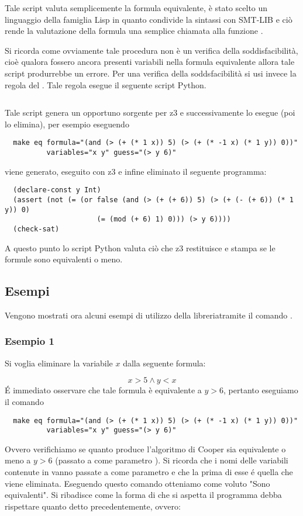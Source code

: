 \documentclass[11pt,letterpaper,twoside]{article}
\begin{document}
Tale script valuta semplicemente la formula equivalente, è stato scelto un
linguaggio della famiglia Lisp in quanto condivide la sintassi con
SMT-LIB e ciò rende la valutazione della formula una semplice chiamata alla
funzione .

Si ricorda come ovviamente tale procedura non è un verifica della
soddisfacibilità, cioè qualora fossero ancora presenti variabili nella formula
equivalente allora tale script produrrebbe un errore. Per una verifica della
soddsfacibilità si usi invece la regola  del .
Tale regola esegue il seguente script Python\autocite{python}.

\inputminted[linenos]{python}{../eq.py}

Tale script genera un opportuno sorgente per
z3\autocite{yices} e successivamente lo esegue (poi lo elimina), per esempio eseguendo

\begin{verbatim}
  make eq formula="(and (> (+ (* 1 x)) 5) (> (+ (* -1 x) (* 1 y)) 0))"
          variables="x y" guess="(> y 6)"
\end{verbatim}

viene generato, eseguito con z3 e infine eliminato il seguente programma:

\begin{verbatim}
  (declare-const y Int)
  (assert (not (= (or false (and (> (+ (+ 6)) 5) (> (+ (- (+ 6)) (* 1 y)) 0)
                      (= (mod (+ 6) 1) 0))) (> y 6))))
  (check-sat)
\end{verbatim}

A questo punto lo script Python valuta ciò che z3 restituisce e stampa se le formule
sono equivalenti o meno.

\subsection{Esempi}
Vengono mostrati ora alcuni esempi di utilizzo della libreriatramite il comando
.
\subsubsection{Esempio 1}
Si voglia eliminare la variabile $x$ dalla seguente formula:

$$ x > 5 \land y < x $$
\'E immediato osservare che tale formula è equivalente a $y > 6$, pertanto
eseguiamo il comando
\begin{verbatim}
  make eq formula="(and (> (+ (* 1 x)) 5) (> (+ (* -1 x) (* 1 y)) 0))"
          variables="x y" guess="(> y 6)"
\end{verbatim}
Ovvero verifichiamo se quanto produce l'algoritmo di Cooper sia equivalente o
meno a $y > 6$ (passato a  come parametro ).
Si ricorda che i nomi delle variabili contenute in  vanno
passate a  come parametro  e che la prima
di esse \'e quella che viene eliminata.
Eseguendo questo comando otteniamo come voluto "Sono equivalenti".
Si ribadisce come la forma di  che si aspetta il programma debba
rispettare quanto detto precedentemente, ovvero:
\end{document}
